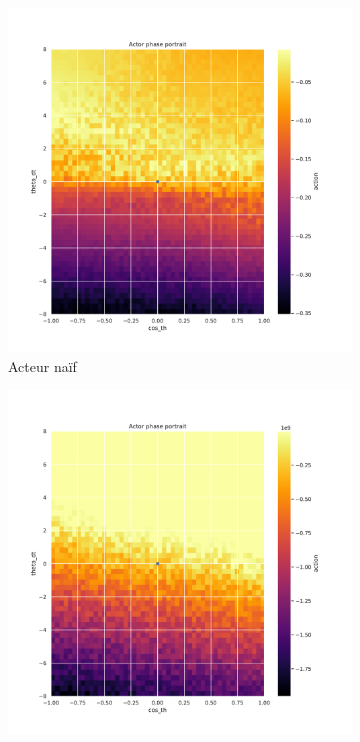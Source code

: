 \begin{figure}[H]
    \centering
    \begin{subfigure}{0.3\textwidth}
        \includegraphics[width=\textwidth]{figures/iteration1/0_actor_normalize__ante_Pendulum-v0.pdf}
        \caption{Acteur naïf}
    \end{subfigure}
    \begin{subfigure}{0.3\textwidth}
        \includegraphics[width=\textwidth]{figures/iteration1/0_actor_normalize__post_Pendulum-v0.pdf}

\end{subfigure}
\end{figure}
